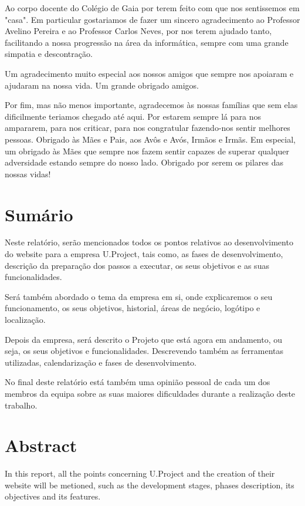 \documentclass[11pt]{report}
\begin{document}
Ao corpo docente do Colégio de Gaia por terem feito com que nos sentissemos em "casa". Em particular gostariamos de fazer um sincero agradecimento ao Professor Avelino Pereira e ao Professor Carlos Neves, por nos terem ajudado tanto, facilitando a nossa progressão na área da informática, sempre com uma grande simpatia e descontração.

Um agradecimento muito especial aos nossos amigos que sempre nos apoiaram e ajudaram na nossa vida.
Um grande obrigado amigos.

Por fim, mas não menos importante, agradecemos às nossas famílias que sem elas dificilmente teriamos chegado até aqui. Por estarem sempre lá para nos ampararem, para nos criticar, para nos congratular fazendo-nos sentir melhores pessoas. 
Obrigado às Mães e Pais, aos Avôs e Avós, Irmãos e Irmãs.
Em especial, um obrigado às Mães que sempre nos fazem sentir capazes de superar qualquer adversidade estando sempre do nosso lado.
Obrigado por serem os pilares das nossas vidas!
\newpage

\chapter*{Sumário}
Neste relatório, serão mencionados todos os pontos relativos ao desenvolvimento do website para a empresa U.Project, tais como, as fases de desenvolvimento, descrição da preparação dos passos a executar, os seus objetivos e as suas funcionalidades.
 
Será também abordado o tema da empresa em si, onde explicaremos o seu funcionamento, os seus objetivos, historial, áreas de negócio, logótipo e localização.

Depois da empresa, será descrito o Projeto que está agora em andamento, ou seja, os seus objetivos e funcionalidades. Descrevendo também as ferramentas utilizadas, calendarização e fases de desenvolvimento.

 No final deste relatório está também uma opinião pessoal de cada um dos membros da equipa sobre as suas maiores dificuldades durante a realização deste trabalho.
\newpage

\chapter*{Abstract}
In this report, all the points concerning U.Project and the creation of their website will be metioned, such as the development stages, phases description, its objectives and its features. 
\end{document}
